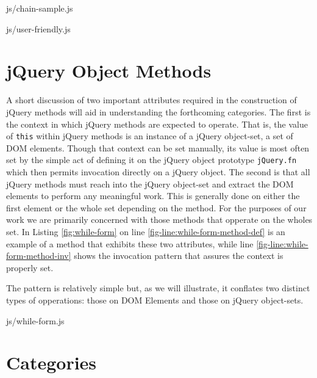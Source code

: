 \documentclass[preprint]{sigplanconf}
\begin{document}
\begin{lstinputlisting}[
    language=JavaScript,
    caption={Sample method chain},
    label={lst:chain-sample}
]{js/chain-sample.js}
\end{lstinputlisting}

\begin{lstinputlisting}[
    language=JavaScript,
    caption={User friendly overhead},
    label={lst:user-friendly}
]{js/user-friendly.js}
\end{lstinputlisting}

\section{jQuery Object Methods}

A short discussion of two important attributes required in the construction of jQuery methods will aid in understanding the forthcoming categories. The first is the context in which jQuery methods are expected to operate. That is, the value of \verb|this| within jQuery methods is an instance of a jQuery object-set, a set of DOM elements. Though that context can be set manually, its value is most often set by the simple act of defining it on the jQuery object prototype \verb|jQuery.fn| which then permits invocation directly on a jQuery object. The second is that all jQuery methods must reach into the jQuery object-set and extract the DOM elements to perform any meaningful work. This is generally done on either the first element or the whole set depending on the method. For the purposes of our work we are primarily concerned with those methods that opperate on the wholes set. In Listing \ref{fig:while-form} on line \ref{fig-line:while-form-method-def} is an example of a method that exhibits these two attributes, while line \ref{fig-line:while-form-method-inv} shows the invocation pattern that assures the context is properly set.

The pattern is relatively simple but, as we will illustrate, it conflates two distinct types of opperations: those on DOM Elements and those on jQuery object-sets.

\begin{lstinputlisting}[
    language=JavaScript,
    caption={Sample jQuery method},
    label={fig:while-form},
    escapeinside={@}{@}
]{js/while-form.js}
\end{lstinputlisting}


\section{Categories}
\end{document}
